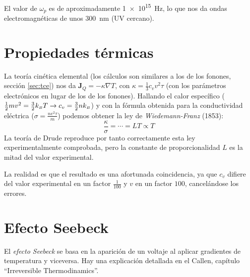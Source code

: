 El valor de $\omega_p$ es de aproximadamente \SI{1e15}{\hertz}, lo
que nos da ondas electromagnéticas de unos \SI{300}{\nano\metre} (UV cercano).


\section{Propiedades térmicas}
La teoría cinética elemental (los cálculos son similares a los de los
fonones, sección \ref{sec:tce}) nos da
$\mathbf{J}_Q = - \kappa \nabla T$, con
$\kappa = \frac{1}{3}c_v v^2 \tau$ (con los parámetros electrónicos en
lugar de los de los fonones). Hallando el calor específico
($\frac{1}{2}mv^2 = \frac{3}{2}k_{\scriptscriptstyle{B}}  T \rightarrow c_v = \frac{3}{2}n
k_{\scriptscriptstyle{B}}  $) y con la fórmula obtenida para la conductividad eléctrica
($\sigma = \frac{ne^2 \tau}{m}$) podemos obtener la ley de
\emph{Wiedemann-Franz} (1853):
\begin{equation}
  \frac{\kappa}{\sigma} = \cdots = LT\propto T
\end{equation}
La teoría de Drude reproduce por tanto correctamente esta ley
experimentalmente comprobada, pero la constante de proporcionalidad
$L$ es la mitad del valor experimental.

La realidad es que el resultado es una afortunada coincidencia, ya que
$c_v$ difiere del valor experimental en un factor $\frac{1}{100}$ y
$v$ en un factor $100$, cancelándose los errores.

\section{Efecto Seebeck}
El \emph{efecto Seebeck} se basa en la aparición de un voltaje al
aplicar gradientes de temperatura y viceversa. Hay una explicación
detallada en el Callen, capítulo ``Irreversible Thermodinamics''.

